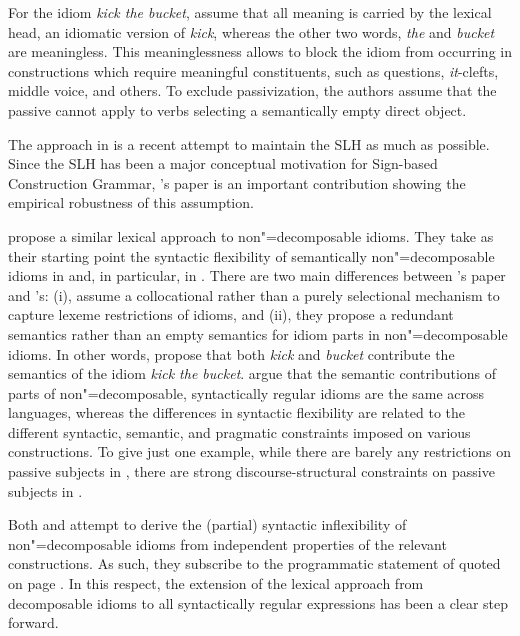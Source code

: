 \documentclass[output=paper
 	        ,biblatex
                ,babelshorthands
                ,newtxmath
                ,draftmode
                ,colorlinks, citecolor=brown
]{langscibook}
\begin{document}
For the idiom \emph{kick the bucket}, \citet{KSF2015a} assume that all meaning is carried by the
lexical head, an idiomatic version of \emph{kick}, whereas the other two words, \emph{the} and
\emph{bucket} are meaningless.  This meaninglessness allows \citeauthor{KSF2015a} to block the idiom from
occurring in constructions which require meaningful constituents, such as questions,
\emph{it}-clefts, middle voice, and others.  To exclude passivization, the authors assume that the
 passive cannot apply to verbs selecting a semantically empty direct object.

The approach in \citet{KSF2015a} is a recent attempt to maintain the SLH as much as possible.  Since
the SLH has been a major conceptual motivation for Sign-based Construction Grammar, \citeauthor{KSF2015a}'s paper is an important contribution showing the
empirical robustness of this assumption.

\citet{Bargmann:Sailer:18} propose a similar lexical approach to non"=de\-com\-pos\-able idioms.
They take as their starting point the syntactic flexibility of semantically non"=decomposable idioms
in  and, in particular, in .  There are two main differences between
\citeauthor{KSF2015a}'s paper and \citeauthor{Bargmann:Sailer:18}'s: (i),
\citeauthor{Bargmann:Sailer:18} assume a collocational rather than a purely selectional mechanism to
capture lexeme restrictions of idioms, and (ii), they propose a redundant semantics rather than an
empty semantics for idiom parts in non"=decomposable idioms. In other words,
\citet{Bargmann:Sailer:18} propose that both \emph{kick} and \emph{bucket} contribute the semantics
of the idiom \emph{kick the bucket}.  \citeauthor{Bargmann:Sailer:18} argue that the semantic
contributions of parts of non"=decomposable, syntactically regular idioms are the same across
languages, whereas the differences in syntactic flexibility are related to the different syntactic,
semantic, and pragmatic constraints imposed on various constructions.  To give just one example,
while there are barely any restrictions on passive subjects in , there are strong
discourse-structural constraints on passive subjects in .

Both \citet{KSF2015a} and \citet{Bargmann:Sailer:18} attempt to derive the (partial) syntactic
inflexibility of non"=decomposable idioms from independent properties of the relevant constructions.
As such, they subscribe to the programmatic statement of \citet{NSW94a} quoted on page
\pageref{NSW-quote}.  In this respect, the extension of the lexical approach from decomposable
idioms to all syntactically regular expressions has been a clear step forward.
\end{document}
